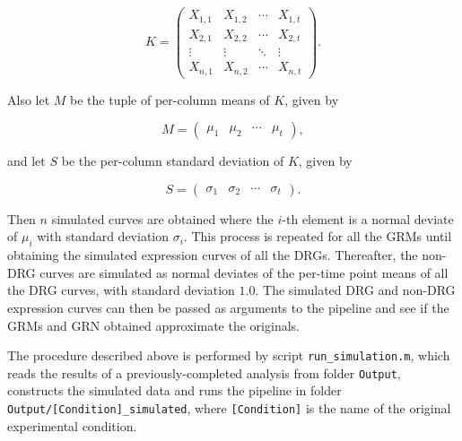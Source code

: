 \documentclass[final,letterpaper,12pt]{article}
\begin{document}
\begin{equation*}
K = 
 \begin{pmatrix}
  X_{1,1} & X_{1,2} & \cdots & X_{1,t} \\
  X_{2,1} & X_{2,2} & \cdots & X_{2,t} \\
  \vdots  & \vdots  & \ddots & \vdots  \\
  X_{n,1} & X_{n,2} & \cdots & X_{n,t} 
 \end{pmatrix}.
\end{equation*}


\par Also let $M$ be the tuple of per-column means of $K$, given by

\begin{equation*}
M = 
 \begin{pmatrix}
  \mu_{1} & \mu_{2} & \cdots & \mu_{t}
 \end{pmatrix},
\end{equation*}

and let $S$ be the per-column standard deviation of $K$, given by

\begin{equation*}
S = 
 \begin{pmatrix}
  \sigma_{1} & \sigma_{2} & \cdots & \sigma_{t}
 \end{pmatrix}.
\end{equation*}

Then $n$ simulated curves are obtained where the $i$-th element is a normal deviate of $\mu_{i}$ with standard deviation $\sigma_{i}$. This process is repeated for all the GRMs until obtaining the simulated expression curves of all the DRGs. Thereafter, the non-DRG curves are simulated as normal deviates of the per-time point means of all the DRG curves, with standard deviation $1.0$. The simulated DRG and non-DRG expression curves can then be passed as arguments to the pipeline and see if the GRMs and GRN obtained approximate the originals.

\par The procedure described above is performed by script \texttt{run\_simulation.m}, which reads the results of a previously-completed analysis from folder \texttt{Output}, constructs the simulated data and runs the pipeline in folder \texttt{Output/[Condition]\_simulated}, where \texttt{[Condition]} is the name of the original experimental condition.



\end{document}

